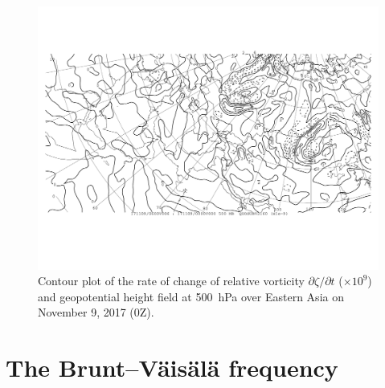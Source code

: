 \documentclass[11pt]{article}
\begin{document}
\begin{figure}[h!]
	\centering
	\includegraphics[width=\textwidth]{dvordt_500hPa_China}
	\caption{Contour plot of the rate of change of relative vorticity $\partial\zeta/\partial t$ ($\times 10^9$) and geopotential height field at \SI{500}{\hecto\Pa} over Eastern Asia on November 9, 2017 (0Z).}
	\label{fig:dvordt_500hPa_China}
\end{figure}


\section{The Brunt--Väisälä frequency}
\end{document}
